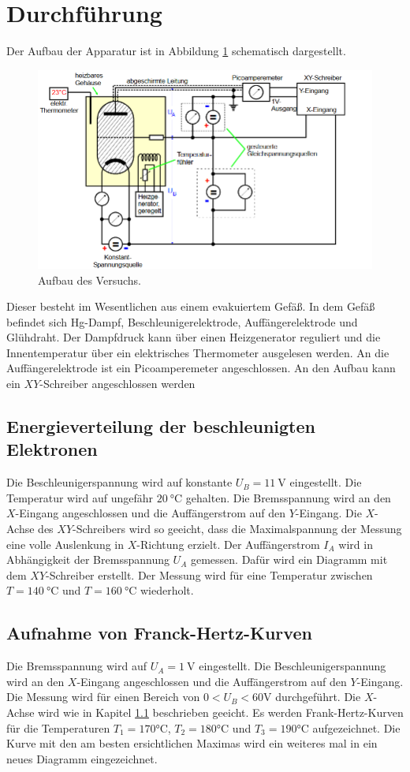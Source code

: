 \section{Durchführung}
\label{sec:Durchführung}
Der Aufbau der Apparatur ist in Abbildung \ref{fig:aufbau} schematisch dargestellt.
\begin{figure}[H]
  \centering
  \includegraphics[width=\textwidth]{content/Aufbau.png}
  \caption{Aufbau des Versuchs\cite{v601}.}
  \label{fig:aufbau}
\end{figure}
\noindent Dieser besteht im Wesentlichen aus einem evakuiertem Gefäß.
In dem Gefäß befindet sich Hg-Dampf, Beschleunigerelektrode, Auffängerelektrode und Glühdraht.
Der Dampfdruck kann über einen Heizgenerator reguliert und die Innentemperatur über ein elektrisches Thermometer ausgelesen werden.
An die Auffängerelektrode ist ein Picoamperemeter angeschlossen.
An den Aufbau kann ein $XY$-Schreiber angeschlossen werden
\subsection{Energieverteilung der beschleunigten Elektronen}
\label{sec:ene}
Die Beschleunigerspannung wird auf konstante $U_B=\SI{+11}{\volt}$ eingestellt.
Die Temperatur wird auf ungefähr $\SI{20}{\degreeCelsius}$ gehalten.
Die Bremsspannung wird an den $X$-Eingang angeschlossen und die Auffängerstrom auf den $Y$-Eingang.
Die $X$-Achse des $XY$-Schreibers wird so geeicht, dass die Maximalspannung der Messung eine volle Auslenkung in $X$-Richtung erzielt.
Der Auffängerstrom $I_A$ wird in Abhängigkeit der Bremsspannung $U_A$ gemessen.
Dafür wird ein Diagramm mit dem $XY$-Schreiber erstellt.
Der Messung wird für eine Temperatur zwischen $T=\SI{140}{\degreeCelsius}$ und $T=\SI{160}{\degreeCelsius}$ wiederholt.
\subsection{Aufnahme von Franck-Hertz-Kurven}
Die Bremsspannung wird auf $U_A = \SI{1}{\volt}$ eingestellt.
Die Beschleunigerspannung wird an den $X$-Eingang angeschlossen und die Auffängerstrom auf den $Y$-Eingang.
Die Messung wird für einen Bereich von $0 < U_B < 60\si{\volt}$ durchgeführt.
Die $X$-Achse wird wie in Kapitel \ref{sec:ene} beschrieben geeicht.
Es werden Frank-Hertz-Kurven für die Temperaturen $T_1= 170\si{\degreeCelsius}$, $T_2= 180\si{\degreeCelsius}$ und $T_3= 190\si{\degreeCelsius}$ aufgezeichnet.
Die Kurve mit den am besten ersichtlichen Maximas wird ein weiteres mal in ein neues Diagramm eingezeichnet.
